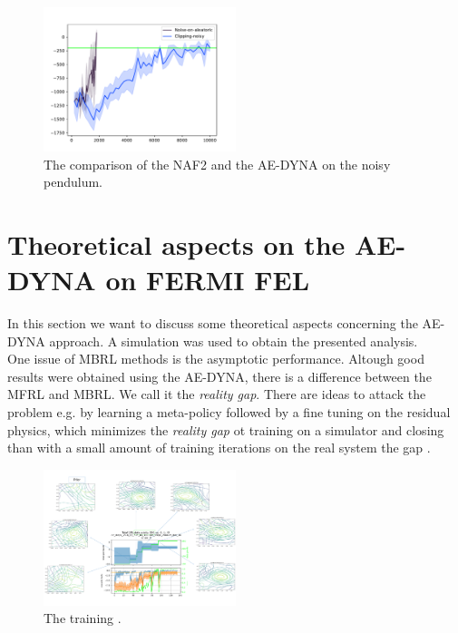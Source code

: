 \documentclass[
 reprint,
 amsmath,amssymb,amsfonts,clevref,
 aps,
prstab,
]{revtex4-2}
\begin{document}
\begin{figure}[!h]
	\centering
	\includegraphics*[width=0.5\textwidth]{Figures/Comparison_NAF_ae_dyna}
	\caption{The comparison of the NAF2 and the AE-DYNA on the noisy pendulum.}
	\label{fig:comparsion_noise_ae_dyna}
\end{figure}

\section{Theoretical aspects on the AE-DYNA on FERMI FEL}
In this section we want to discuss some theoretical aspects concerning the AE-DYNA approach. A simulation was used to obtain the presented analysis. \\
One issue of MBRL methods is the asymptotic performance. Altough good results were obtained using the AE-DYNA, there is a difference between the MFRL and MBRL. We call it the \emph{reality gap}. There are ideas to attack the problem e.g. by learning a meta-policy \cite{Clavera2018} followed by a fine tuning on the residual physics, which minimizes the \emph{reality gap} ot training on a simulator and closing than with a small amount of training iterations on the real system the gap \cite{Zeng2019}.
\begin{figure}[!h]
	\centering
	\includegraphics*[width=0.5\textwidth]{Figures/Learning_evolution}
	\caption{The training .}
	\label{fig:Learning_evolution}
\end{figure}

 
\end{document}
